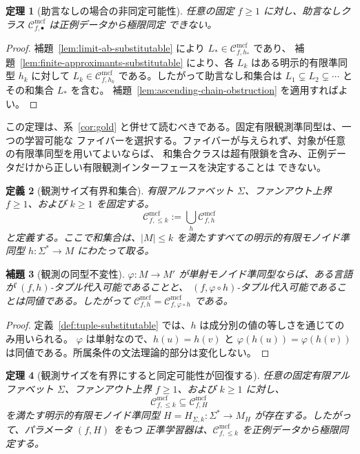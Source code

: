 \documentclass[11pt,a4paper]{ltjsarticle}
\newtheorem{theorem}{定理}[section]
\newtheorem{lemma}[theorem]{補題}
\newtheorem{definition}[theorem]{定義}
\theoremstyle{remark}
\newcommand{\Cmcf}[2]{\mathcal{C}^{\mathrm{mcf}}_{#1,#2}}
\begin{document}
\begin{theorem}[助言なしの場合の非同定可能性]
\label{thm:no-advice-nonidentifiability}
任意の固定 \(f\ge1\) に対し、助言なしクラス \(\Cmcf{f}{\bullet}\) は正例データから極限同定
できない。
\end{theorem}

\begin{proof}
補題~\ref{lem:limit-ab-substitutable} により \(L_*\in\Cmcf{f}{h_*}\) であり、
補題~\ref{lem:finite-approximants-substitutable} により、各 \(L_k\) はある明示的有限準同型
\(h_k\) に対して \(L_k\in\Cmcf{f}{h_k}\) である。したがって助言なし和集合は
\(L_1\subsetneq L_2\subsetneq\cdots\) とその和集合 \(L_*\) を含む。
補題~\ref{lem:ascending-chain-obstruction} を適用すればよい。
\end{proof}

この定理は、系~\ref{cor:gold} と併せて読むべきである。固定有限観測準同型は、一つの学習可能な
ファイバーを選択する。ファイバーが与えられず、対象が任意の有限準同型を用いてよいならば、
和集合クラスは超有限鎖を含み、正例データだけから正しい有限観測インターフェースを決定することは
できない。

\begin{definition}[観測サイズ有界和集合]
\label{def:bounded-observation-union}
有限アルファベット \(\Sigma\)、ファンアウト上界 \(f\ge1\)、および \(k\ge1\) を固定する。
\[
  \Cmcf{f}{\le k}:=\bigcup_h \Cmcf{f}{h}
\]
と定義する。ここで和集合は、\(|M|\le k\) を満たすすべての明示的有限モノイド準同型
\(h:\Sigma^*\to M\) にわたって取る。
\end{definition}

\begin{lemma}[観測の同型不変性]
\label{lem:iso-invariance}
\(\varphi:M\to M'\) が単射モノイド準同型ならば、ある言語が \((f,h)\)-タプル代入可能であることと、
\((f,\varphi\circ h)\)-タプル代入可能であることは同値である。したがって
\(\Cmcf{f}{h}=\Cmcf{f}{\varphi\circ h}\) である。
\end{lemma}

\begin{proof}
定義~\ref{def:tuple-substitutable} では、\(h\) は成分別の値の等しさを通じてのみ用いられる。
\(\varphi\) は単射なので、\(h(u)=h(v)\) と
\(\varphi(h(u))=\varphi(h(v))\) は同値である。所属条件の文法理論的部分は変化しない。
\end{proof}

\begin{theorem}[観測サイズを有界にすると同定可能性が回復する]
\label{thm:bounded-union-identifiable}
任意の固定有限アルファベット \(\Sigma\)、ファンアウト上界 \(f\ge1\)、および \(k\ge1\) に対し、
\[
  \Cmcf{f}{\le k}\subseteq\Cmcf{f}{H}
\]
を満たす明示的有限モノイド準同型
\(H=H_{\Sigma,k}:\Sigma^*\to M_H\) が存在する。したがって、パラメータ \((f,H)\) をもつ
正準学習器は、\(\Cmcf{f}{\le k}\) を正例データから極限同定する。
\end{theorem}
\end{document}
